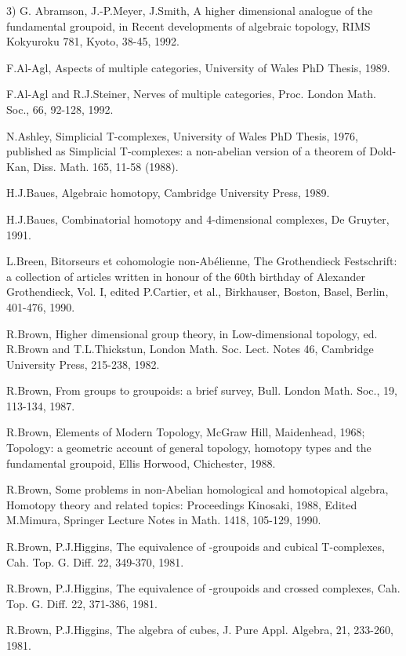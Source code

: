 3) G. Abramson, J.-P.Meyer, J.Smith, A higher  dimensional
analogue  of  the fundamental groupoid, in Recent developments
of  algebraic  topology,  RIMS Kokyuroku 781, Kyoto, 38-45,
1992. 

F.Al-Agl, Aspects of multiple categories, University of Wales
PhD  Thesis, 1989.

F.Al-Agl and R.J.Steiner, Nerves of  multiple  categories,
Proc.  London Math. Soc., 66, 92-128, 1992. 

N.Ashley, Simplicial T-complexes, University of Wales PhD
Thesis, 1976, published as Simplicial T-complexes: a non-abelian
version of a theorem of Dold-Kan, Diss. Math. 165, 11-58 (1988).

H.J.Baues, Algebraic homotopy, Cambridge University Press, 1989.

H.J.Baues, Combinatorial homotopy and 4-dimensional complexes,
De Gruyter,  1991. 

L.Breen, Bitorseurs et cohomologie non-Ab\'{e}lienne, The
Grothendieck Festschrift: a collection of articles written in
honour of the 60th birthday of Alexander Grothendieck, Vol. I,
edited P.Cartier, et  al., Birkhauser, Boston, Basel, Berlin,
401-476, 1990. 

R.Brown, Higher dimensional group theory, in Low-dimensional
topology, ed. R.Brown and T.L.Thickstun, London Math. Soc. Lect.
Notes 46, Cambridge University Press, 215-238, 1982. 

R.Brown, From groups to groupoids: a brief survey,  Bull.
London  Math.  Soc., 19, 113-134, 1987. 

R.Brown, Elements  of  Modern  Topology,  McGraw  Hill,
Maidenhead,  1968;    Topology: a geometric account of general
topology, homotopy types  and  the fundamental groupoid, Ellis
Horwood, Chichester, 1988. 

R.Brown, Some problems in non-Abelian homological and
homotopical  algebra, Homotopy theory and related topics:
Proceedings Kinosaki, 1988, Edited M.Mimura, Springer Lecture
Notes in Math. 1418,  105-129,  1990. 

R.Brown,  P.J.Higgins,  The  equivalence  of
\omega -groupoids   and   cubical T-complexes, Cah. Top.
G\eom. Diff. 22, 349-370, 1981. 

R.Brown,  P.J.Higgins,  The  equivalence  of 
\infty -groupoids   and   crossed complexes, Cah. Top. G\eom.
Diff. 22, 371-386, 1981. 

R.Brown, P.J.Higgins, The algebra of cubes, J. Pure  Appl.
Algebra,  21,  233-260, 1981. 

